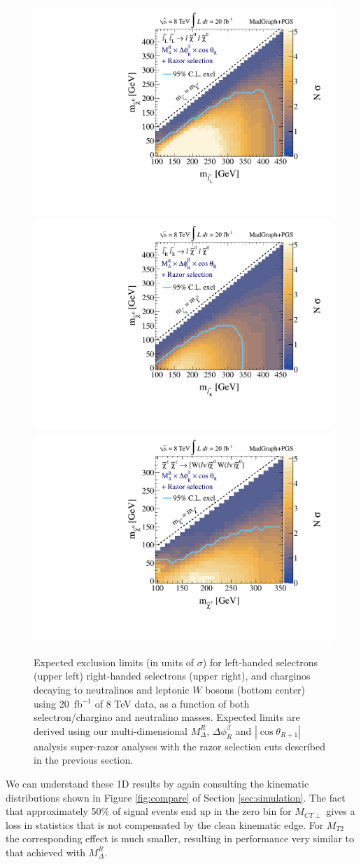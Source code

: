\begin{figure}[ht]
\includegraphics[width=0.4\columnwidth]{fig/sectionV/LIMIT2D_selectronL_Razor_MdeltaAngles.pdf}
\includegraphics[width=0.4\columnwidth]{fig/sectionV/LIMIT2D_selectronR_Razor_MdeltaAngles.pdf}
\includegraphics[width=0.4\columnwidth]{fig/sectionV/LIMIT2D_chargino_Razor_MdeltaAngles.pdf}
\caption{Expected exclusion limits (in units of $\sigma$) for left-handed selectrons (upper left) right-handed selectrons (upper right), and charginos decaying to neutralinos and leptonic $W$ bosons (bottom center) using 20~fb$^{-1}$ of 8 TeV data, as a function of both selectron/chargino and neutralino masses. Expected limits are derived using our multi-dimensional $M_\Delta^R$, $\Delta\phi_R^\beta$ and $|\cos\theta_{R+1}|$ analysis super-razor analyses with the razor selection cuts described in the previous section.  \label{fig:results_2D_best}}
\end{figure}


We can understand these 1D results by again consulting the kinematic distributions shown
in Figure \ref{fig:compare} of Section \ref{sec:simulation}. The fact that approximately 50\% of
signal events end up in the zero bin for $M_{CT\perp}$ gives a loss in statistics that is not
compensated by the clean kinematic edge. For $M_{T2}$ the corresponding effect is much smaller,
resulting in performance very similar to that achieved with $M_\Delta^R$.

